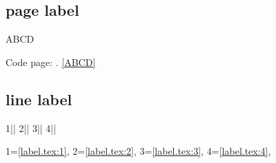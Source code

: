 \noindent
\subsection{page label}
\bgroup
\begin{CDRBlock}[reflabel=ABCD]
ABCD
\end{CDRBlock}
Code page: \pageref{ABCD}. \ref{ABCD}
\egroup
%
\subsection{line label}
\begin{CDRBlock}[pygments=true,escapeinside=||]
1|\label{label.tex:1}|
2|\label{label.tex:2}|
3|\label{label.tex:3}|
4|\label{label.tex:4}|
\end{CDRBlock}
1=\ref{label.tex:1},
2=\ref{label.tex:2},
3=\ref{label.tex:3},
4=\ref{label.tex:4},

